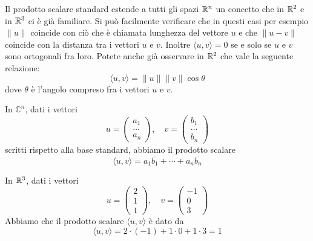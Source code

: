 \begin{observation}
	Il prodotto scalare standard estende a tutti gli spazi $\mathbb{R}^n$ un concetto
	che in $\mathbb{R}^2$ e in $\mathbb{R}^3$ ci è già familiare. Si può
	facilmente verificare che in questi casi per esempio $\| u \|$ coincide con
	ciò che è chiamata lunghezza del vettore $u$ e che $\| u - v \|$ coincide
	con la distanza tra i vettori $u$ e $v$. Inoltre $\langle u, v \rangle = 0$ se
	e solo se $u$ e $v$ sono ortogonali fra loro. Potete anche già osservare in
	$\mathbb{R}^2$ che vale la seguente relazione:
	\[
		\langle u, v \rangle = \| u \| \| v \| \cos \theta
	\]
	dove $\theta$ è l'angolo compreso fra i vettori $u$ e $v$.
\end{observation}

\begin{example}
	In $\mathbb{C}^n$, dati i vettori
	\[
		u = \begin{pmatrix}
			a_1 \\ \dots \\ a_n
		\end{pmatrix}, \quad
		v = \begin{pmatrix}
			b_1 \\ \dots \\ b_n
		\end{pmatrix}
	\]
	scritti rispetto alla base standard, abbiamo il prodotto scalare
	\[
		\langle u, v \rangle = a_1 \overline{b_1} + \cdots + a_n \overline{b_n}
	\]
\end{example}

\begin{example}
	In $\mathbb{R}^3$, dati i vettori
	\[
		u = \begin{pmatrix}
			2 \\ 1 \\ 1
		\end{pmatrix}, \quad
		v = \begin{pmatrix}
			-1 \\ 0 \\ 3
		\end{pmatrix}
	\]
	Abbiamo che il prodotto scalare $\langle u, v \rangle$ è dato da
	\[
		\langle u, v \rangle = 2 \cdot (-1) + 1 \cdot 0 + 1 \cdot 3 = 1
	\]
\end{example}

